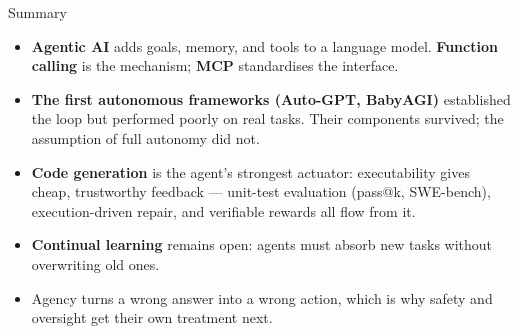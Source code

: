 \begin{frame}{Summary}
  \begin{itemize}
    \item[\textcolor{red}{$\blacktriangleright$}] \textbf{Agentic AI} adds goals, memory, and tools to a
      language model. \textbf{Function calling} is the mechanism; \textbf{MCP} standardises the interface.
    \item[\textcolor{red}{$\blacktriangleright$}] \textbf{The first autonomous frameworks (Auto-GPT, BabyAGI)}
      established the loop but performed poorly on real tasks. Their components survived; the assumption of
      full autonomy did not.
    \item[\textcolor{red}{$\blacktriangleright$}] \textbf{Code generation} is the agent's strongest
      actuator: executability gives cheap, trustworthy feedback --- unit-test evaluation (pass@k,
      SWE-bench), execution-driven repair, and verifiable rewards all flow from it.
    \item[\textcolor{red}{$\blacktriangleright$}] \textbf{Continual learning} remains open: agents must absorb
      new tasks without overwriting old ones.
    \item[\textcolor{red}{$\blacktriangleright$}] Agency turns a wrong answer into a wrong action, which is why
      safety and oversight get their own treatment next.
  \end{itemize}
\end{frame}
